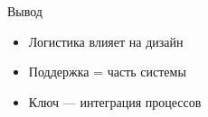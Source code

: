 \documentclass{beamer}
\begin{document}

\begin{frame}{Вывод}
\begin{itemize}
    \item Логистика влияет на дизайн
    \item Поддержка = часть системы
    \item Ключ — интеграция процессов
\end{itemize}

\end{frame}
\end{document}
